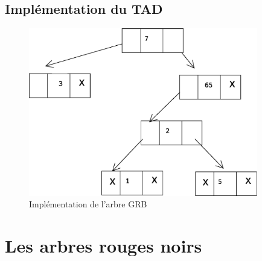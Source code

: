 	\subsection{Implémentation du TAD}
\begin{figure}[H]
\centering
\includegraphics[width=10cm]{content/schemas/arbresGRBImplementation.eps}
\caption{Implémentation de l'arbre GRB}
\end{figure}


\section{Les arbres rouges noirs}
